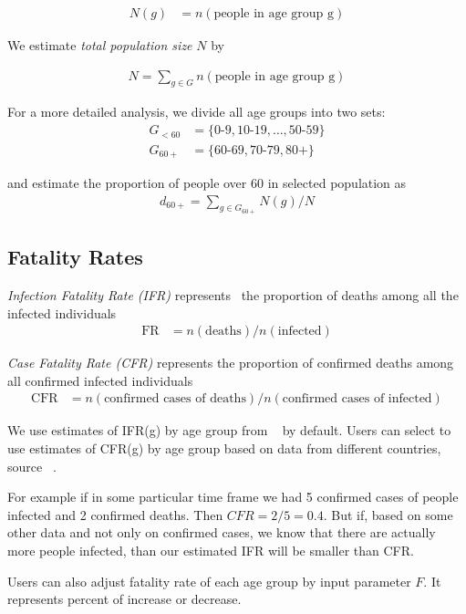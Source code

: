 \documentclass[12pt]{article}
\begin{document}
\begin{align*}
N(g) &=
  n(\text{people in age group g})
\end{align*}

We estimate {\it total population size} $N$ by

\begin{align*}
N = \sum_{g \in G}
  n(\text{people in age group g})
\end{align*}

For a more detailed analysis, we divide all age groups into two sets:
\begin{align*}
G_{<60} &=
  \{ \text{0-9}, \text{10-19}, \ldots, \text{50-59} \} \\
G_{60+} &=
  \{ \text{60-69}, \text{70-79}, \text{80+} \}
\end{align*}

and estimate the proportion of people over 60 in selected population as
\begin{align*}
d_{60+} = \sum_{g \in G_{60+}} N(g) / N
\end{align*}

\subsection*{Fatality Rates}
{\it Infection Fatality Rate (IFR)} represents~\cite{cfr_wiki} the proportion of deaths among all the infected individuals
\begin{align*}
\text{FR} &=
  n(\text{deaths}) /
  n(\text{infected})
\end{align*}

{\it Case Fatality Rate (CFR)} represents the proportion of confirmed deaths among all confirmed infected individuals
\begin{align*}
\text{CFR} &=
 n( \text{confirmed cases of deaths} ) /
 n( \text{confirmed cases of infected} )
\end{align*}

We use estimates of IFR(g) by age group from ~\cite{imperial} by default. Users can select to use estimates of CFR(g) by age group based on data from different countries, source ~\cite{cfrs}.

For example if in some particular time frame we had 5 confirmed cases of people infected and 2 confirmed deaths. Then $CFR = 2/5 = 0.4$. But if, based on some other data and not only on confirmed cases, we know that there are actually more people infected, than our estimated IFR will be smaller than CFR.

Users can also adjust fatality rate of each age group by input parameter $F$. It represents percent of increase or decrease.
\end{document}
